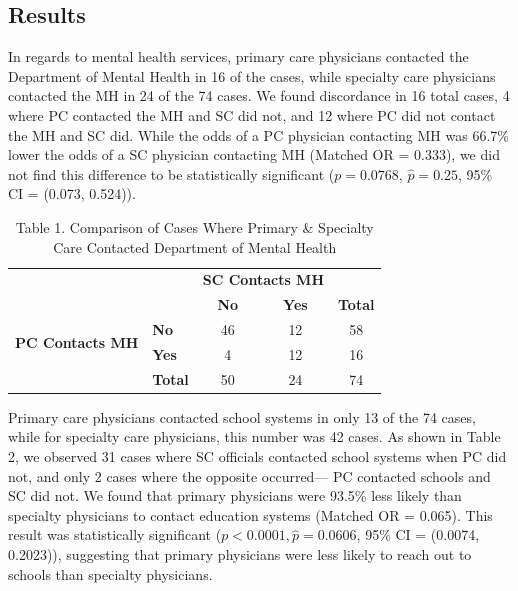 \documentclass{article}
\begin{document}
	\subsection*{Results}
	In regards to mental health services, primary care physicians contacted the Department of Mental Health in 16 of the cases, while specialty care physicians contacted the MH in 24 of the 74 cases. We found discordance in 16 total cases, 4 where PC contacted the MH and SC did not, and 12 where PC did not contact the MH and SC did. While the odds of a PC physician contacting MH was 66.7\% lower the odds of a SC physician contacting MH (Matched OR = 0.333), we did not find this difference to be statistically significant ($p = 0.0768$, $\hat{p} = 0.25$, 95\% CI = (0.073, 0.524)).



	\begin{table}[h]
		\centering
		\footnotesize
		\captionsetup{labelformat=empty}
		\caption{Table 1. Comparison of Cases Where Primary \& Specialty Care Contacted Department of Mental Health}
		\renewcommand{\arraystretch}{1.2}
		\begin{tabular}{llccc}
			\toprule
			& & \multicolumn{2}{c}{\textbf{SC Contacts MH}} & \\  
			\cmidrule(lr){3-4}
			& & \textbf{No} & \textbf{Yes} & \textbf{Total} \\  
			\midrule
			\multirow{2}{*}{\textbf{PC Contacts MH}} & \textbf{No} & 46 & 12 & 58 \\  
			& \textbf{Yes} & 4 & 12 & 16 \\  
			\midrule
			& \textbf{Total} & 50 & 24 & 74 \\  
			\bottomrule
		\end{tabular}
		\label{tab:pc_sc_mh}
	\end{table}


	Primary care physicians contacted school systems in only 13 of the 74 cases, while for specialty care physicians, this number was 42 cases. As shown in Table 2, we observed 31 cases where SC officials contacted school systems when PC did not, and only 2 cases where the opposite occurred— PC contacted schools and SC did not. We found that primary physicians were 93.5\% less likely than specialty physicians to contact education systems (Matched OR = 0.065). This result was statistically significant ($p < 0.0001, \hat{p} = 0.0606$, 95\% CI = (0.0074, 0.2023)), suggesting that primary physicians were less likely to reach out to schools than specialty physicians.
\end{document}
